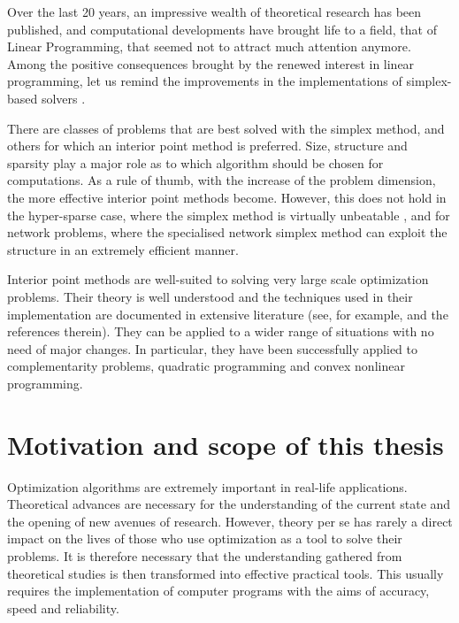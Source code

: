 Over the last 20 years, an impressive wealth of theoretical research
has been published, and computational developments have brought life
to a field, that of Linear Programming, that seemed not to attract much
attention anymore.
Among the positive consequences brought by the renewed interest in linear
programming, let us remind the improvements in the implementations of 
simplex-based solvers \cite{Bixby94,Bixby02}.

There are classes of problems that are best solved with the simplex
method, and others for which an interior point method is preferred.
Size, structure and sparsity play a major role as to which
algorithm should be chosen for computations.
As a rule of thumb, with the increase of the problem dimension, the 
more effective interior point methods become.
However, this does not hold in the hyper-sparse case, where the
simplex method is virtually unbeatable \cite{Bixby02,HallMcKinnon05}, 
and for network problems,
where the specialised network simplex method can exploit the
structure in an extremely efficient manner.

Interior point methods are well-suited to solving very
large scale optimization problems. Their theory is well understood
\cite{RoosTerlakyVial,ipm:Wright97,Ye97} 
and the techniques used in their implementation 
are documented in extensive literature (see, for example, 
\cite{AndersenGondzioMeszarosXu,GondzioTerlaky,LustigMarstenShanno94} 
and the references therein).
They can be applied to a wider range of situations with no need
of major changes. In particular, they have been successfully applied to
complementarity problems, quadratic programming and convex 
nonlinear programming.


%
%
\section{Motivation and scope of this thesis}

Optimization algorithms are extremely important in real-life 
applications. Theoretical advances are necessary for the 
understanding of the current state and the opening of new avenues 
of research. 
However, theory per se has rarely a direct impact on the lives 
of those who use optimization as a tool to solve their problems.
It is therefore necessary that the understanding gathered from
theoretical studies is then transformed into effective practical
tools. This usually requires the implementation of computer programs
with the aims of accuracy, speed and reliability.

